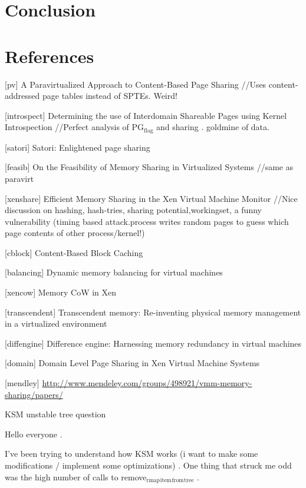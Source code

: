 \documentclass[11pt]{article}
\begin{document}
\section{Conclusion}
\label{sec-14}



  
\section{References}
\label{sec-15}

[pv] A Paravirtualized Approach to Content-Based Page Sharing 
//Uses content-addressed page tables instead of SPTEs. Weird!

[introspect] Determining the use of Interdomain Shareable Pages using
Kernel Introspection
//Perfect analysis of PG$_{\mathrm{flag}}$ and sharing . goldmine of data.

[satori] Satori: Enlightened page sharing

[feasib] On the Feasibility of Memory Sharing in Virtualized Systems
//same as paravirt

[xenshare] Eﬃcient Memory Sharing in the Xen Virtual Machine Monitor 
//Nice discussion on hashing, hash-tries, sharing potential,workingset, a funny
vulnerability (timing based attack.process writes random pages to
guess which page contents of other process/kernel!)

[cblock] Content-Based Block Caching

[balancing] Dynamic memory balancing for virtual machines

[xencow] Memory CoW in Xen

[transcendent] Transcendent memory: Re-inventing physical memory
management in a virtualized environment

[diffengine] Difference engine: Harnessing memory redundancy in
virtual machines

[domain] Domain Level Page Sharing in Xen Virtual Machine Systems

[mendley] \href{http://www.mendeley.com/groups/498921/vmm-memory-sharing/papers/}{http://www.mendeley.com/groups/498921/vmm-memory-sharing/papers/}

KSM unstable tree question

Hello everyone .

I've been trying to understand how KSM works (i want to make some modifications / implement some optimizations) .
One thing that struck me odd was the high number of calls to remove$_{\mathrm{rmap}}$$_{\mathrm{item}}$$_{\mathrm{from}}$$_{\mathrm{tree}}$ .
\end{document}
